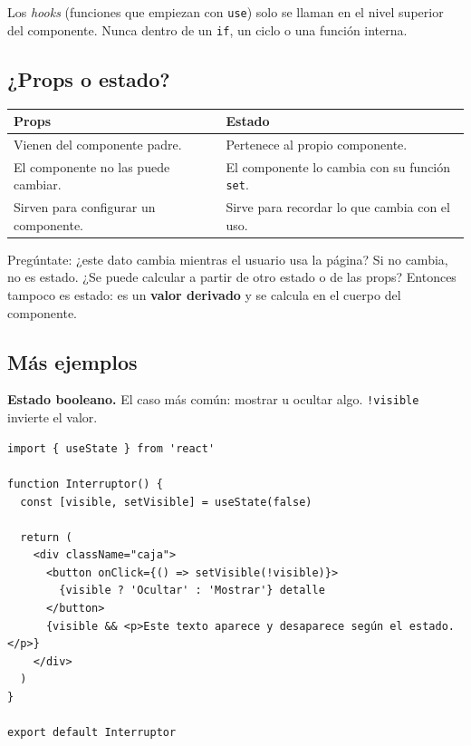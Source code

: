 \documentclass[11pt,a4paper]{article}
\newcommand{\cmd}[1]{\texttt{\color{reactdark}#1}}
\begin{document}
\begin{atencion}
Los \emph{hooks} (funciones que empiezan con \cmd{use}) solo se llaman en el nivel superior del componente. Nunca dentro de un \cmd{if}, un ciclo o una función interna.
\end{atencion}

\subsection{¿Props o estado?}

\begin{center}
\small
\begin{tabular}{p{6.3cm} p{6.3cm}}
\toprule
\textbf{Props} & \textbf{Estado} \\
\midrule
Vienen del componente padre. & Pertenece al propio componente. \\
El componente no las puede cambiar. & El componente lo cambia con su función \cmd{set}. \\
Sirven para configurar un componente. & Sirve para recordar lo que cambia con el uso. \\
\bottomrule
\end{tabular}
\end{center}

Pregúntate: ¿este dato cambia mientras el usuario usa la página? Si no cambia, no es estado. ¿Se puede calcular a partir de otro estado o de las props? Entonces tampoco es estado: es un \textbf{valor derivado} y se calcula en el cuerpo del componente.

\subsection{Más ejemplos}

\textbf{Estado booleano.} El caso más común: mostrar u ocultar algo. \cmd{!visible} invierte el valor.

\begin{lstlisting}[language=JSX,title={\small\ttfamily src/components/estado/Interruptor.jsx}]
import { useState } from 'react'

function Interruptor() {
  const [visible, setVisible] = useState(false)

  return (
    <div className="caja">
      <button onClick={() => setVisible(!visible)}>
        {visible ? 'Ocultar' : 'Mostrar'} detalle
      </button>
      {visible && <p>Este texto aparece y desaparece según el estado.</p>}
    </div>
  )
}

export default Interruptor
\end{lstlisting}
\end{document}
